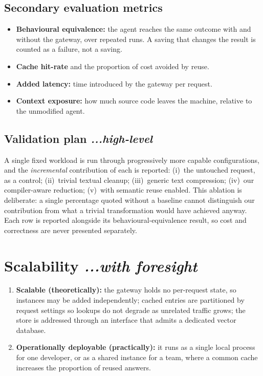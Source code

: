 \documentclass[11pt,a4paper]{article}
\newcommand{\BvrHint}[1]{%
  {\normalfont\normalsize\itshape\hfill #1}}
\begin{document}
\subsection{Secondary evaluation metrics}
\begin{itemize}[noitemsep]
  \item \textbf{Behavioural equivalence:} the agent reaches the same outcome with
        and without the gateway, over repeated runs. A saving that changes the
        result is counted as a failure, not a saving.
  \item \textbf{Cache hit-rate} and the proportion of cost avoided by reuse.
  \item \textbf{Added latency:} time introduced by the gateway per request.
  \item \textbf{Context exposure:} how much source code leaves the machine,
        relative to the unmodified agent.
\end{itemize}

\subsection{Validation plan \BvrHint{...high-level}}
A single fixed workload is run through progressively more capable
configurations, and the \emph{incremental} contribution of each is reported:
(i)~the untouched request, as a control; (ii)~trivial textual cleanup;
(iii)~generic text compression; (iv)~our compiler-aware reduction;
(v)~with semantic reuse enabled. This ablation is deliberate: a single
percentage quoted without a baseline cannot distinguish our contribution from
what a trivial transformation would have achieved anyway. Each row is reported
alongside its behavioural-equivalence result, so cost and correctness are never
presented separately.

\section{Scalability \BvrHint{...with foresight}}

\begin{enumerate}[noitemsep]
  \item \textbf{Scalable (theoretically):} the gateway holds no per-request
        state, so instances may be added independently; cached entries are
        partitioned by request settings so lookups do not degrade as unrelated
        traffic grows; the store is addressed through an interface that admits a
        dedicated vector database.
  \item \textbf{Operationally deployable (practically):} it runs as a single
        local process for one developer, or as a shared instance for a team,
        where a common cache increases the proportion of reused answers.
\end{enumerate}
\end{document}
